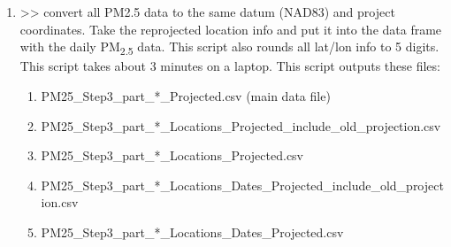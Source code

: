 \begin{enumerate}[nolistsep]
\begin{enumerate}[nolistsep]
	\end{enumerate}

\item {} >> convert all PM2.5 data to the same datum (NAD83) and project coordinates. Take the reprojected location info and put it into the data frame with the daily PM\textsubscript{2.5} data. This script also rounds all lat/lon info to 5 digits. This script takes about 3 minutes on a laptop. This script outputs these files:

\begin{enumerate}[nolistsep]
\item PM25\_Step3\_part\_*\_Projected.csv (main data file)
\item PM25\_Step3\_part\_*\_Locations\_Projected\_include\_old\_projection.csv
\item PM25\_Step3\_part\_*\_Locations\_Projected.csv
\item PM25\_Step3\_part\_*\_Locations\_Dates\_Projected\_include\_old\_projection.csv
\item PM25\_Step3\_part\_*\_Locations\_Dates\_Projected.csv
\end{enumerate}


\end{enumerate}

